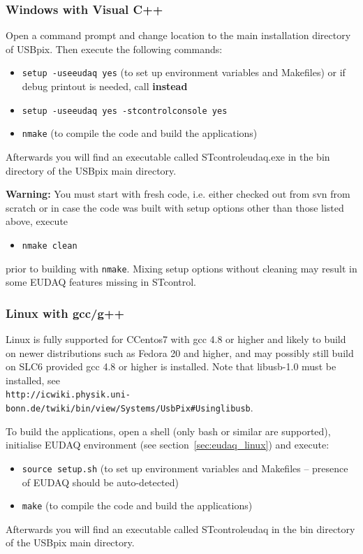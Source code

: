 \documentclass[a4paper,12pt]{article}
\begin{document}
\subsubsection{Windows with Visual C++}

Open a command prompt and change location to the main installation
directory of USBpix. Then execute the following commands:
\begin{itemize}
\item {\tt setup -useeudaq yes}
 (to set up environment variables and Makefiles) or if debug printout is needed, call {\bf instead}
\item {\tt setup -useeudaq yes -stcontrol\textunderscore console yes}
\item {\tt nmake} (to compile the code and build the applications)
\end{itemize}
Afterwards you will find an executable called STcontrol\textunderscore eudaq.exe in the bin
directory of the USBpix main directory.

\textbf{Warning:} You must start with fresh code, i.e. either checked out from svn from scratch or in case the code was built 
with setup options other than those listed above, execute
\begin{itemize}
\item {\tt nmake clean}
\end{itemize}
prior to building with {\tt nmake}. Mixing setup options without cleaning may result in some EUDAQ features missing in STcontrol.

\subsubsection{Linux with gcc/g++}

Linux is fully supported for CCentos7 with gcc 4.8 or higher and likely to build on newer distributions such as 
Fedora 20 and higher, and may possibly still build on SLC6 provided gcc 4.8 or higher is installed. 
Note that libusb-1.0 must be installed, see \\
{\tt http://icwiki.physik.uni-bonn.de/twiki/bin/view/Systems/UsbPix\#Using\textunderscore libusb}.

To build the applications, open a shell (only bash or similar are supported), 
initialise EUDAQ environment (see section~\ref{sec:eudaq_linux}) and
execute:
\begin{itemize}
\item {\tt source setup.sh} 
(to set up environment variables and Makefiles -- presence of EUDAQ should be auto-detected)
\item {\tt make} (to compile the code and build the applications)
\end{itemize}
Afterwards you will find an executable called STcontrol\textunderscore eudaq in the bin
directory of the USBpix main directory.
\end{document}
